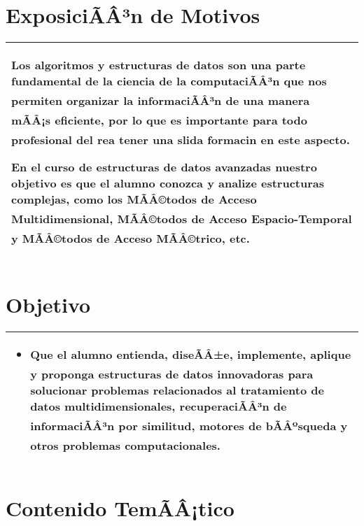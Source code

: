 \documentclass[a4paper]{article}
\begin{document}
\bigskip

\section{ExposiciÃÂ³n de Motivos}
\begin{tabularx}{\textwidth}{|X|}\hline
Los algoritmos y estructuras de datos son una parte fundamental de la ciencia de la computaciÃÂ³n que nos permiten organizar la informaciÃÂ³n de una manera mÃÂ¡s eficiente, por lo que es importante para todo profesional del  rea tener una s lida formaci n en este aspecto.

En el curso de estructuras de datos avanzadas nuestro objetivo es que el alumno conozca y analize estructuras complejas, como los MÃÂ©todos de Acceso Multidimensional, MÃÂ©todos de Acceso Espacio-Temporal y MÃÂ©todos de Acceso MÃÂ©trico, etc.

\\ \hline
\end{tabularx}

\section{Objetivo}
\begin{tabularx}{\textwidth}{|X|} \hline
\begin{itemize}
\item Que el alumno entienda, diseÃÂ±e, implemente, aplique y
proponga estructuras de datos innovadoras para solucionar
problemas relacionados al tratamiento de datos multidimensionales,
recuperaciÃÂ³n de informaciÃÂ³n por similitud, motores de bÃÂºsqueda y
otros problemas computacionales.

\end{itemize} 
\\ \hline
\end{tabularx}

\section{Contenido TemÃÂ¡tico}
\end{document}
